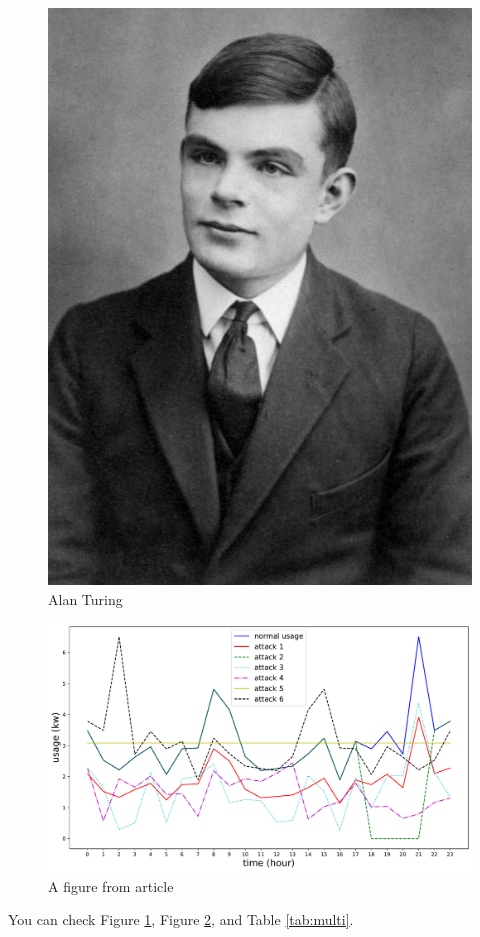\documentclass[]{book} %
\begin{document}
\begin{figure}[!h]
	\centering
    \includegraphics[width=0.5\linewidth]{Turing.jpeg}
    \caption[Turing]{Alan Turing}
	\label{fig:turing}
\end{figure}

\clearpage

\begin{figure}[!h]
	\includegraphics[width=\linewidth,scale=1]{attack.pdf}
	\caption{A figure from article \cite{tehrani2020decision}}
	\label{fig:attack}
\end{figure}

\lipsum {}

You can check Figure \ref{fig:turing}, Figure \ref{fig:attack}, and Table \ref{tab:multi}.


\clearpage



\printindex
\end{document}
